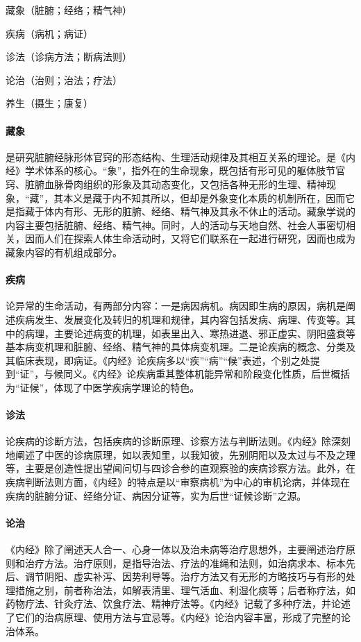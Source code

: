 \documentclass[draft,12pt]{ctexbook}
\begin{document}
藏象（脏腑；经络；精气神）

疾病（病机；病证）

诊法（诊病方法；断病法则）

论治（治则；治法；疗法）

养生（摄生；康复）

\paragraph{藏象}  是研究脏腑经脉形体官窍的形态结构、生理活动规律及其相互关系的理论。是《内经》学术体系的核心。“象”，指外在的生命现象，既包括有形可见的躯体肢节官窍、脏腑血脉骨肉组织的形象及其动态变化，又包括各种无形的生理、精神现象，“藏”，其本义是藏于内不知其所以，但却是外象变化本质的机制所在，因而它是指藏于体内有形、无形的脏腑、经络、精气神及其永不休止的活动。藏象学说的内容主要包括脏腑、经络、精气神。同时，人的活动与天地自然、社会人事密切相关，因而人们在探索人体生命活动时，又将它们联系在一起进行研究，因而也成为藏象内容的有机组成部分。

\paragraph{疾病}  论异常的生命活动，有两部分内容：一是病因病机。病因即生病的原因，病机是阐述疾病发生、发展变化及转归的机理和规律，其内容包括发病、病理、传变等。其中的病理，主要论述病变的机理，如表里出入、寒热进退、邪正虚实、阴阳盛衰等基本病变机理和脏腑、经络、精气神的具体病变机理。二是论疾病的概念、分类及其临床表现，即病证。《内经》论疾病多以“疾”“病”“候”表述，个别之处提到“证”，与候同义。《内经》论疾病重其整体机能异常和阶段变化性质，后世概括为“证候”，体现了中医学疾病学理论的特色。

\paragraph{诊法}  论疾病的诊断方法，包括疾病的诊断原理、诊察方法与判断法则。《内经》除深刻地阐述了中医的诊病原理，如以表知里，以我知彼，先别阴阳以及太过与不及之理等，主要是创造性提出望闻问切与四诊合参的直观察验的疾病诊察方法。此外，在疾病判断法则方面，《内经》的特点是以“审察病机”为中心的审机论病，并体现在疾病的脏腑分证、经络分证、病因分证等，实为后世“证候诊断”之源。

\paragraph{论治}  《内经》除了阐述天人合一、心身一体以及治未病等治疗思想外，主要阐述治疗原则和治疗方法。治疗原则，是指导治法、疗法的准绳和法则，如治病求本、标本先后、调节阴阳、虚实补泻、因势利导等。治疗方法又有无形的方略技巧与有形的处理措施之别，前者称治法，如解表清里、理气活血、利湿化痰等；后者称疗法，如药物疗法、针灸疗法、饮食疗法、精神疗法等。《内经》记载了多种疗法，并论述了它们的治病原理、使用方法与宜忌等。《内经》论治内容丰富，形成了完整的论治体系。
\end{document}
